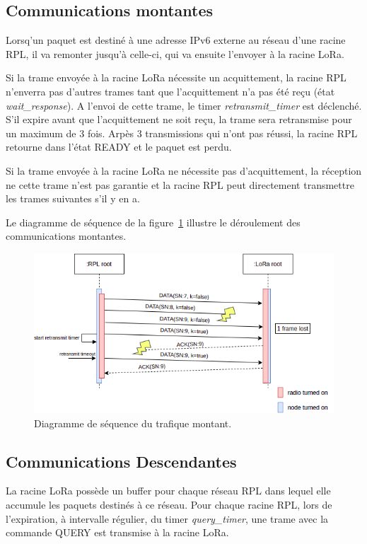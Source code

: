 \subsection*{Communications montantes}%
    Lorsq'un paquet est destiné à une adresse IPv6 externe au réseau d'une racine RPL, il va remonter jusqu'à celle-ci, qui va ensuite l'envoyer à la racine LoRa.

    Si la trame envoyée à la racine LoRa nécessite un acquittement, la racine RPL n'enverra pas d'autres trames tant que l'acquittement n'a pas été reçu (état \textit{wait\_response}).
    A l'envoi de cette trame, le timer \textit{retransmit\_timer} est déclenché. S'il expire avant que l'acquittement ne soit reçu, la trame sera retransmise pour un maximum de 3 fois.
    Arpès 3 transmissions qui n'ont pas réussi, la racine RPL retourne dans l'état READY et le paquet est perdu.

    Si la trame envoyée à la racine LoRa ne nécessite pas d'acquittement, la réception ne cette trame n'est pas garantie et la racine RPL peut directement transmettre les trames suivantes s'il y en a.

    Le diagramme de séquence de la figure~\ref{fig:proto-seq-upward} illustre le déroulement des communications montantes.
    \begin{figure}[H]
        \centering
        \includegraphics[scale=0.6]{res/pictures/loramac-sequence-UPWARD.drawio.png}
        \caption{Diagramme de séquence du trafique montant.}
        \label{fig:proto-seq-upward}
    \end{figure}    

\subsection*{Communications Descendantes}%
    La racine LoRa possède un buffer pour chaque réseau RPL dans lequel elle accumule les paquets destinés à ce réseau. Pour chaque racine RPL, lors de l'expiration, à intervalle régulier, du timer \textit{query\_timer}, une trame avec la commande QUERY est transmise à la racine LoRa.

